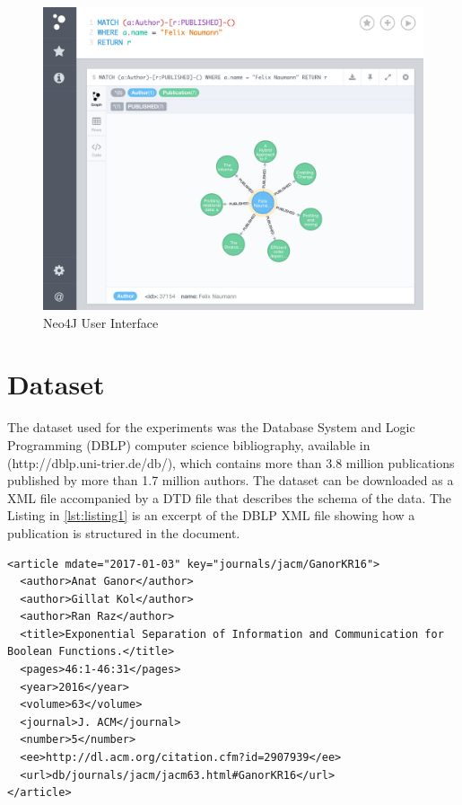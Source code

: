 \begin{figure}[ht]
\centering
\includegraphics[width=1\textwidth]{../neo4j_user_interface.png}
\caption{Neo4J User Interface}
\label{fig:figure31}
\end{figure}

\section{Dataset}

The dataset used for the experiments was the Database System and Logic Programming (DBLP) computer science bibliography, available in (http://dblp.uni-trier.de/db/), which contains more than 3.8 million publications published by more than 1.7 million authors. The dataset can be downloaded as a XML file accompanied by a DTD file that describes the schema of the data. The Listing in \ref{lst:listing1} is an excerpt of the DBLP XML file showing how a publication is structured in the document.


\begin{lstlisting}
<article mdate="2017-01-03" key="journals/jacm/GanorKR16">
  <author>Anat Ganor</author>
  <author>Gillat Kol</author>
  <author>Ran Raz</author>
  <title>Exponential Separation of Information and Communication for Boolean Functions.</title>
  <pages>46:1-46:31</pages>
  <year>2016</year>
  <volume>63</volume>
  <journal>J. ACM</journal>
  <number>5</number>
  <ee>http://dl.acm.org/citation.cfm?id=2907939</ee>
  <url>db/journals/jacm/jacm63.html#GanorKR16</url>
</article>
\end{lstlisting}

